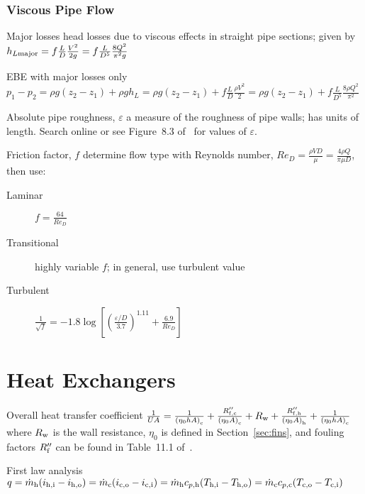 \documentclass{article}
\begin{document}
\subsubsection{Viscous Pipe Flow}
\begin{description*}
\item[Major losses] head losses due to viscous effects in straight pipe sections; given by
  \(h_{L\mathrm{major}} = f\frac{L}{D}\frac{V^2}{2g} = f\frac{L}{D^5}\frac{8Q^2}{\pi^2g}\)
\item[EBE with major losses only]
  \(p_1-p_2 = \rho{}g(z_2-z_1)+\rho{}gh_L = \rho{}g(z_2-z_1) + f\frac{L}{D}\frac{\rho{}V^2}{2}
  = \rho{}g(z_2-z_1) + f\frac{L}{D^5}\frac{8\rho{}Q^2}{\pi^2}\)
\item[Absolute pipe roughness, $\varepsilon$] a measure of the roughness of pipe walls; has units of
  length. Search online or see Figure~8.3 of~\cite{hamt} for values of $\varepsilon$.
\item[Friction factor, $f$] determine flow type with Reynolds number,
  \(\mathit{Re}_D = \frac{\rho{}VD}{\mu} = \frac{4\rho{}Q}{\pi\mu{}D}\), then use:
  \begin{description}
  \item[Laminar]
    \(f = \frac{64}{\mathit{Re}_D}\)
  \item[Transitional]
    highly variable $f$; in general, use turbulent value
  \item[Turbulent]
    \(\frac{1}{\sqrt{f}}
    = -1.8\log\left[{\left(\frac{\varepsilon/D}{3.7}\right)}^{1.11}
      + \frac{6.9}{\mathit{Re}_D}\right]\)
  \end{description}
\end{description*}

\section{Heat Exchangers}
\label{sec:heat-exchangers}

\begin{description*}
\item[Overall heat transfer coefficient]
  \(\frac{1}{UA} = \frac{1}{{(\eta_0 h A)}_{\mathrm{c}}} + \frac{R_{\mathrm{f,c}}''}{{(\eta_0 A)}_{\mathrm{c}}}
  + R_{\mathrm{w}} + \frac{R_{\mathrm{f,h}}''}{{(\eta_0 A)}_{\mathrm{h}}} + \frac{1}{{(\eta_0 h A)}_{\mathrm{c}}}\)
  where $R_{\mathrm{w}}$ is the wall resistance, $\eta_0$ is defined in Section~\ref{sec:fins}, and
  fouling factors $R_{\mathrm{f}}''$ can be found in Table~11.1 of~\cite{hamt}.
\item[First law analysis]
  \(q = \dot{m}_{\mathrm{h}}(i_{\mathrm{h,i}} - i_{\mathrm{h,o}})
  = \dot{m}_{\mathrm{c}}(i_{\mathrm{c,o}} - i_{\mathrm{c,i}})
  = \dot{m}_{\mathrm{h}}c_{p,\mathrm{h}}(T_{\mathrm{h,i}} - T_{\mathrm{h,o}})
  = \dot{m}_{\mathrm{c}}c_{p,\mathrm{c}}(T_{\mathrm{c,o}} - T_{\mathrm{c,i}})\)
\end{description*}
\end{document}
